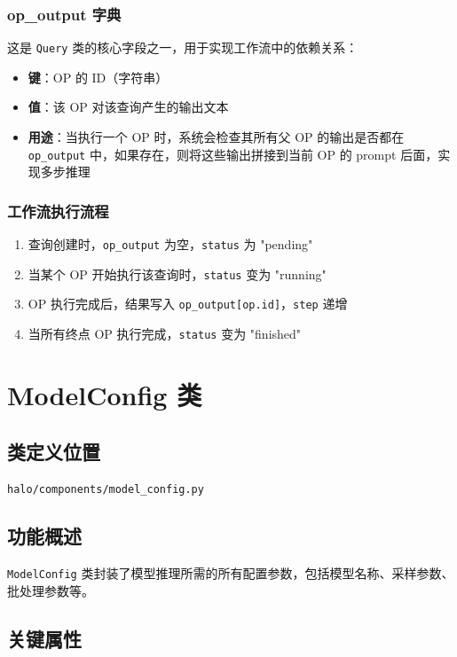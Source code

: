 \documentclass[12pt,a4paper]{article}
\begin{document}
\subsubsection{op_output 字典}
这是 \texttt{Query} 类的核心字段之一，用于实现工作流中的依赖关系：
\begin{itemize}
    \item \textbf{键}：OP 的 ID（字符串）
    \item \textbf{值}：该 OP 对该查询产生的输出文本
    \item \textbf{用途}：当执行一个 OP 时，系统会检查其所有父 OP 的输出是否都在 \texttt{op_output} 中，如果存在，则将这些输出拼接到当前 OP 的 prompt 后面，实现多步推理
\end{itemize}

\subsubsection{工作流执行流程}
\begin{enumerate}
    \item 查询创建时，\texttt{op_output} 为空，\texttt{status} 为 "pending"
    \item 当某个 OP 开始执行该查询时，\texttt{status} 变为 "running"
    \item OP 执行完成后，结果写入 \texttt{op_output[op.id]}，\texttt{step} 递增
    \item 当所有终点 OP 执行完成，\texttt{status} 变为 "finished"
\end{enumerate}

\section{ModelConfig 类}

\subsection{类定义位置}
\texttt{halo/components/model_config.py}

\subsection{功能概述}
\texttt{ModelConfig} 类封装了模型推理所需的所有配置参数，包括模型名称、采样参数、批处理参数等。

\subsection{关键属性}
\end{document}
